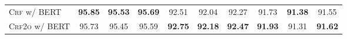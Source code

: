 \begin{table*}[tb]
\begin{tabularx}{\textwidth}{lccccccccc}
        \textsc{Crf} w/ BERT                            & \textbf{95.85}           & \textbf{95.53}             & \textbf{95.69}           & 92.51                    & 92.04                    & 92.27                    & 91.73          & \textbf{91.38} & 91.55          \\
        \textsc{Crf2o} w/ BERT                          & 95.73                    & 95.45                      & 95.59                    & \textbf{92.75}           & \textbf{92.18}           & \textbf{92.47}           & \textbf{91.93} & 91.31          & \textbf{91.62} \\
        \bottomrule
    \end{tabularx}
    \label{table:con-test}
\end{table*}

